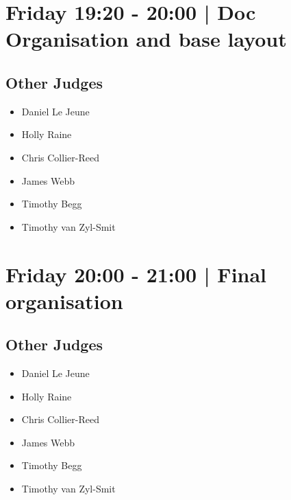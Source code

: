 \documentclass[10pt]{article}
\begin{document}
            \section*{Friday 19:20
        -
        20:00
        |
         Doc Organisation and base layout}
        
                
        \subsection*{Other Judges}
        
            \begin{itemize}
                            \item Daniel Le Jeune
                            \item Holly Raine
                            \item Chris Collier-Reed
                            \item James Webb
                            \item Timothy Begg
                            \item Timothy van Zyl-Smit
                        \end{itemize}
        

            \section*{Friday 20:00
        -
        21:00
        |
         Final organisation}
        
                
        \subsection*{Other Judges}
        
            \begin{itemize}
                            \item Daniel Le Jeune
                            \item Holly Raine
                            \item Chris Collier-Reed
                            \item James Webb
                            \item Timothy Begg
                            \item Timothy van Zyl-Smit
                        \end{itemize}
        
\end{document}
